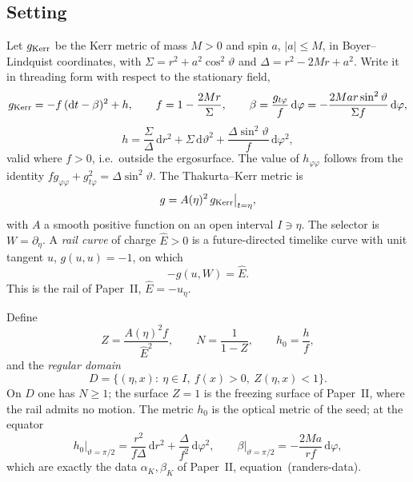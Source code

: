 \documentclass[aip,jmp,amsmath,amssymb,reprint]{revtex4-2}
\newcommand{\Ehat}{\hat E}
\newcommand{\dd}{\mathrm{d}}
\theoremstyle{plain}
\theoremstyle{definition}
\begin{document}
\subsection{Setting}
Let $g_{\rm Kerr}$ be the Kerr metric of mass $M>0$ and spin $a$, $|a|\le M$, in
Boyer--Lindquist coordinates, with $\Sigma=r^2+a^2\cos^2\vartheta$ and
$\Delta=r^2-2Mr+a^2$. Write it in threading form with respect to the stationary field,
\begin{equation}
  g_{\rm Kerr}=-f\,(\dd t-\beta)^2+h,\qquad
  f=1-\frac{2Mr}{\Sigma},\qquad
  \beta=\frac{g_{t\varphi}}{f}\,\dd\varphi=-\frac{2Mar\sin^2\vartheta}{\Sigma f}\,\dd\varphi,
  \label{eq:threading}
\end{equation}
\begin{equation}
  h=\frac{\Sigma}{\Delta}\,\dd r^2+\Sigma\,\dd\vartheta^2
    +\frac{\Delta\sin^2\vartheta}{f}\,\dd\varphi^2 ,
  \label{eq:h}
\end{equation}
valid where $f>0$, i.e.\ outside the ergosurface. The value of $h_{\varphi\varphi}$
follows from the identity $f g_{\varphi\varphi}+g_{t\varphi}^2=\Delta\sin^2\vartheta$.
The Thakurta--Kerr metric is
\begin{equation}
  g=A(\eta)^2\,g_{\rm Kerr}\big|_{t=\eta},
  \label{eq:TK}
\end{equation}
with $A$ a smooth positive function on an open interval $I\ni\eta$. The selector is
$W=\partial_\eta$. A \emph{rail curve} of charge $\Ehat>0$ is a future-directed timelike
curve with unit tangent $u$, $g(u,u)=-1$, on which
\begin{equation}
  -g(u,W)=\Ehat .
  \label{eq:rail}
\end{equation}
This is the rail of Paper~II, $\Ehat=-u_\eta$.

Define
\begin{equation}
  Z=\frac{A(\eta)^2f}{\Ehat^2},\qquad N=\frac1{1-Z},\qquad h_0=\frac hf ,
  \label{eq:ZN}
\end{equation}
and the \emph{regular domain}
\begin{equation}
  D=\{(\eta,x):\ \eta\in I,\ f(x)>0,\ Z(\eta,x)<1\}.
  \label{eq:D}
\end{equation}
On $D$ one has $N\ge1$; the surface $Z=1$ is the freezing surface of Paper~II, where the
rail admits no motion. The metric $h_0$ is the optical metric of the seed; at the
equator
\begin{equation}
  h_0\big|_{\vartheta=\pi/2}=\frac{r^2}{f\Delta}\,\dd r^2+\frac{\Delta}{f^2}\,\dd\varphi^2,
  \qquad \beta\big|_{\vartheta=\pi/2}=-\frac{2Ma}{rf}\,\dd\varphi ,
  \label{eq:equatorial-data}
\end{equation}
which are exactly the data $\alpha_K,\beta_K$ of Paper~II, equation~(randers-data).
\end{document}
